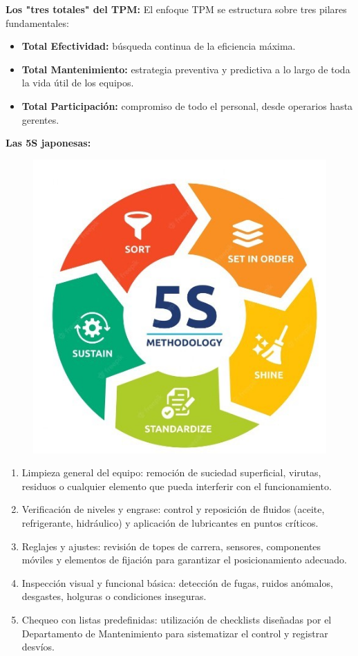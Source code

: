 \documentclass[a4paper,oneside,11pt]{article}
\begin{document}
\begin{enumerate}
    \textbf{Los "tres totales" del TPM:} El enfoque TPM se estructura sobre tres pilares fundamentales:
    
    \begin{itemize}
        \item \textbf{Total Efectividad:} búsqueda continua de la eficiencia máxima.
        \item \textbf{Total Mantenimiento:} estrategia preventiva y predictiva a lo largo de toda la vida útil de los equipos.
        \item \textbf{Total Participación:} compromiso de todo el personal, desde operarios hasta gerentes.
    \end{itemize}

    \textbf{Las 5S japonesas:}

    \begin{figure} [ht!]
        \centering
        \includegraphics[width=0.5\linewidth]{5s.png}
    \end{figure}

    \begin{enumerate}
        \item Limpieza general del equipo: remoción de suciedad superficial, virutas, residuos o cualquier elemento que pueda interferir con el funcionamiento.
        \item Verificación de niveles y engrase: control y reposición de fluidos (aceite, refrigerante, hidráulico) y aplicación de lubricantes en puntos críticos.
        \item Reglajes y ajustes: revisión de topes de carrera, sensores, componentes móviles y elementos de fijación para garantizar el posicionamiento adecuado.
        \item Inspección visual y funcional básica: detección de fugas, ruidos anómalos, desgastes, holguras o condiciones inseguras.
        \item Chequeo con listas predefinidas: utilización de checklists diseñadas por el Departamento de Mantenimiento para sistematizar el control y registrar desvíos.
    \end{enumerate}



\end{enumerate}
\end{document}
